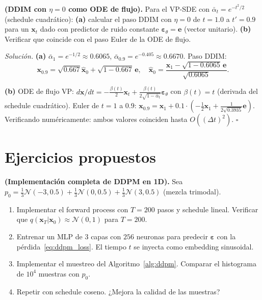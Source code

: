 \begin{ejercicio}
\label{ej:ddim_determinismo}
\textbf{(DDIM con $\eta=0$ como ODE de flujo).}
Para el VP-SDE con $\bar{\alpha}_t = e^{-t^2/2}$ (schedule cuadrático):
\textbf{(a)} calcular el paso DDIM con $\eta=0$ de $t=1.0$ a $t'=0.9$
para un $\bm{x}_t$ dado con predictor de ruido constante $\bm{\varepsilon}_\theta =
\bm{e}$ (vector unitario).
\textbf{(b)} Verificar que coincide con el paso Euler de la ODE de flujo.

\medskip\noindent\textit{Solución.}
\textbf{(a)} $\bar{\alpha}_1 = e^{-1/2}\approx 0.6065$, $\bar{\alpha}_{0.9} =
e^{-0.405}\approx 0.6670$. Paso DDIM:
\[
  \bm{x}_{0.9} = \sqrt{0.667}\hat{\bm{x}}_0 + \sqrt{1-0.667}\,\bm{e},
  \quad \hat{\bm{x}}_0 = \frac{\bm{x}_1 - \sqrt{1-0.6065}\,\bm{e}}{\sqrt{0.6065}}.
\]

\textbf{(b)} ODE de flujo VP: $d\bm{x}/dt = -\frac{\beta(t)}{2}\bm{x}_t
+ \frac{\beta(t)}{2\sqrt{1-\bar{\alpha}_t}}\bm{\varepsilon}_\theta$
con $\beta(t) = t$ (derivada del schedule cuadrático). Euler de $t=1$ a $0.9$:
$\bm{x}_{0.9} = \bm{x}_1 + 0.1\cdot(-\frac{1}{2}\bm{x}_1 + \frac{1}{2\sqrt{0.3935}}
\bm{e})$. Verificando numéricamente: ambos valores coinciden hasta $O((\Delta t)^2)$.
$\square$
\end{ejercicio}

\section*{Ejercicios propuestos}

\begin{ejercicio}
\textbf{(Implementación completa de DDPM en 1D).}
Sea $p_0 = \frac{1}{3}\mathcal{N}(-3,0.5) + \frac{1}{3}\mathcal{N}(0,0.5)
+ \frac{1}{3}\mathcal{N}(3,0.5)$ (mezcla trimodal).
\begin{enumerate}[label=(\alph*)]
  \item Implementar el forward process con $T=200$ pasos y schedule lineal.
        Verificar que $q(\bm{x}_T|\bm{x}_0)\approx\mathcal{N}(0,1)$ para
        $T=200$.
  \item Entrenar un MLP de 3 capas con $256$ neuronas para predecir
        $\bm{\varepsilon}$ con la pérdida~\eqref{eq:ddpm_loss}.
        El tiempo $t$ se inyecta como embedding sinusoidal.
  \item Implementar el muestreo del Algoritmo~\ref{alg:ddpm}. Comparar
        el histograma de $10^4$ muestras con $p_0$.
  \item Repetir con schedule coseno. ¿Mejora la calidad de las muestras?
\end{enumerate}
\end{ejercicio}

